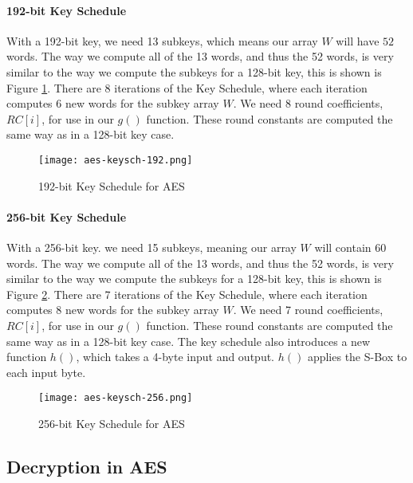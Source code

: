 \paragraph{192-bit Key Schedule}

With a 192-bit key, we need 13 subkeys, which means our array $W$ will have $52$ words. The way we compute all of the 13 words, and thus the 52 words, is very similar to the way we compute the subkeys for a 128-bit key, this is shown is Figure \ref{AES-KeySch-192}. There are 8 iterations of the Key Schedule, where each iteration computes 6 new words for the subkey array $W$. We need 8 round coefficients, $RC[i]$, for use in our $g()$ function. These round constants are computed the same way as in a 128-bit key case.

\begin{figure}[H]
\begin{center}
\texttt{[image: aes-keysch-192.png]}
\end{center}
\caption{192-bit Key Schedule for AES}
\label{AES-KeySch-192}
\end{figure}

\paragraph{256-bit Key Schedule}

With a 256-bit key. we need 15 subkeys, meaning our array $W$ will contain 60 words. The way we compute all of the 13 words, and thus the 52 words, is very similar to the way we compute the subkeys for a 128-bit key, this is shown is Figure \ref{AES-KeySch-256}. There are 7 iterations of the Key Schedule, where each iteration computes 8 new words for the subkey array $W$. We need 7 round coefficients, $RC[i]$, for use in our $g()$ function. These round constants are computed the same way as in a 128-bit key case. The key schedule also introduces a new function $h()$, which takes a 4-byte input and output. $h()$ applies the S-Box to each input byte. 

\begin{figure}[H]
\begin{center}
\texttt{[image: aes-keysch-256.png]}
\end{center}
\caption{256-bit Key Schedule for AES}
\label{AES-KeySch-256}
\end{figure}

\subsection{Decryption in AES}

